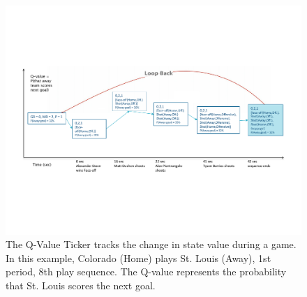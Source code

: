 \documentclass[runningheads,a4paper]{llncs}
\begin{document}
\begin{figure}[htbp]
\includegraphics[width = 1\columnwidth]{q-ticker}
\caption{The Q-Value Ticker tracks the change in state value during a game. In this example, Colorado (Home) plays St. Louis (Away), 1st period, 8th play sequence. The Q-value represents the probability that St. Louis scores the next goal.}
\label{fig:state-transition-graph}
\end{figure}
\end{document}

